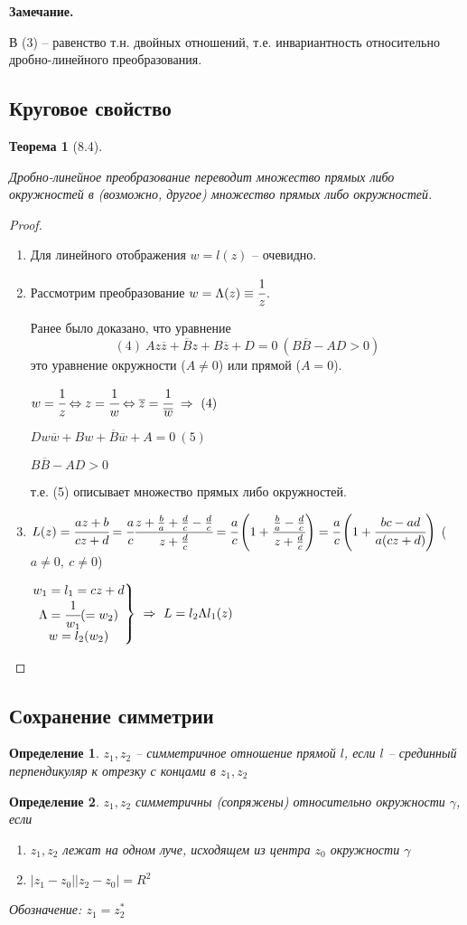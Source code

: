 \documentclass[draft]{report}
\newcommand{\forcenewline}{$\phantom{\mbox{newline}}$\newline}
\newcommand{\then}{\ \Rightarrow\ }
\newcommand{\LRA}{\Leftrightarrow}
\renewcommand{\bar}{\overline}
\newcommand{\g}{\gamma}
\renewcommand{\L}{\Lambda}
\newcommand{\z}{\bar{z}}
\newcommand{\bsys}[1]{\left.\begin{matrix}#1\end{matrix}\right\}}
\newcommand{\opr}[1]{\begin{opred}#1\end{opred}}
\newtheorem*{theor}{Теорема}
\newtheorem*{opred}{Определение}
\theoremstyle{remark}
\begin{document}
{\bfseries Замечание.}

В (3) -- равенство т.н. двойных отношений, т.е. инвариантность относительно дробно-линейного преобразования.

\subsection{Круговое свойство}

\begin{theor}[8.4]
\forcenewline

Дробно-линейное преобразование переводит множество прямых либо окружностей в (возможно, другое) множество прямых либо окружностей.
\end{theor}
\begin{proof}
\forcenewline
\begin{enumerate}
\item Для линейного отображения $w=l(z)$ -- очевидно.
\item Рассмотрим преобразование $w=\Lambda(z)\equiv \cfrac 1z$.

Ранее было доказано, что уравнение
$$
(4)\ Az\z+\bar{B}z+B\z+D=0\ (B\bar{B}-AD>0)
$$
это уравнение окружности ($A\neq0$) или прямой ($A=0$).

$w=\cfrac 1z \LRA z=\cfrac 1w \LRA \bar{z}=\cfrac {1}{\bar{w}} \then (4)$

$Dw\bar{w}+Bw+\bar{B}\bar{w}+A=0\ (5)$

$B\bar{B}-AD>0$

т.е. (5) описывает множество прямых либо окружностей.
\item $L(z)=\cfrac{az+b}{cz+d}=\cfrac ac \cfrac {z+\frac ba+\frac dc-\frac dc}{z+\frac dc}=\cfrac ac\left(1+\cfrac{\frac ba-\frac dc}{z+\frac dc}\right)=\cfrac ac\left(1+\cfrac{bc-ad}{a(cz+d)}\right)$ ($a\neq 0,\ c\neq 0$)

$\bsys{w_1=l_1=cz+d \\ \L=\cfrac {1}{w_1}(=w_2) \\ w=l_2(w_2)}\then L=l_2\L l_1(z)$
\end{enumerate}
\end{proof}

\subsection{Сохранение симметрии}

\opr{$z_1, z_2$ -- симметричное отношение прямой $l$, если $l$ -- срединный перпендикуляр к отрезку с концами в $z_1, z_2$}
\opr{$z_1, z_2$ симметричны (сопряжены) относительно окружности $\g$, если
\begin{enumerate}
\item $z_1, z_2$ лежат на одном луче, исходящем из центра $z_0$ окружности $\g$
\item $|z_1-z_0||z_2-z_0|=R^2$
\end{enumerate}
Обозначение: $z_1=z_2^*$}
\end{document}
